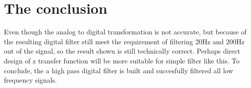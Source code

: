 \documentclass{article}
\begin{document}
\pagebreak
\section{The conclusion}
Even though the analog to digital transformation is not accurate, but because of the resulting digital filter still meet the requirement of filtering 20Hz and 200Hz out of the signal, so the result shown is still technically correct. Perhaps direct design of z transfer function will be more suitable for simple filter like this. To conclude, the a high pass digital filter is built and succesfully filtered all low frequency signals.
\end{document}
